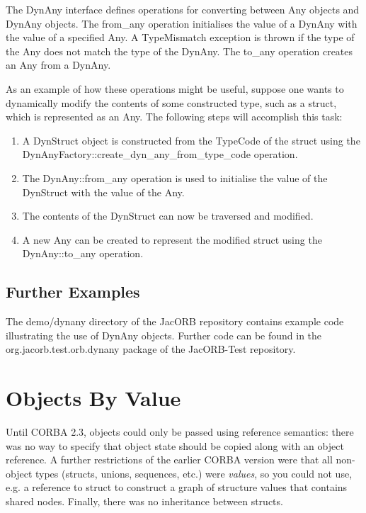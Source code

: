 \documentclass[12pt]{scrbook}
\begin{document}
The DynAny interface defines operations for converting between Any
objects and DynAny objects.  The from\_any operation initialises the
value of a DynAny with the value of a specified Any.  A TypeMismatch
exception is thrown if the type of the Any does not match the type of
the DynAny.  The to\_any operation creates an Any from a DynAny.

As an example of how these operations might be useful, suppose one
wants to dynamically modify the contents of some constructed type,
such as a struct, which is represented as an Any.  The following
steps will accomplish this task:

\begin{enumerate}
  \item  A DynStruct object is constructed from the TypeCode of the struct using the DynAnyFactory::create\_dyn\_any\_from\_type\_code operation.
  \item  The DynAny::from\_any operation is used to initialise the value of the DynStruct with the value of the Any.
  \item  The contents of the DynStruct can now be traversed and modified.
  \item  A new Any can be created to represent the modified struct using the DynAny::to\_any operation.
\end{enumerate}

\section{Further Examples}

The demo/dynany directory of the JacORB repository contains example
code illustrating the use of DynAny objects.  Further code can be
found in the org.jacorb.test.orb.dynany package of the JacORB-Test
repository.


\chapter{Objects By Value}
\label{ch:obv}

Until CORBA 2.3, objects could only be passed using reference
semantics: there was no way to specify that object state should be
copied along with an object reference. A further restrictions of the
earlier CORBA version were that all non-object types (structs, unions,
sequences, etc.) were {\em values}, so you could not use, e.g. a
reference to struct to construct a graph of structure values that
contains shared nodes. Finally, there was no inheritance between
structs.
\end{document}
